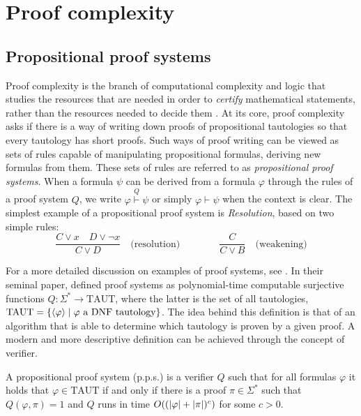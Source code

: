\chapter{Proof complexity} \label{chap:proof_complexity}

\section{Propositional proof systems}

Proof complexity is the branch of computational complexity and logic that studies the resources that are needed in order to \textit{certify} mathematical statements, rather than the resources needed to decide them \cite{kraj_book, arora_barak}. At its core, proof complexity asks if there is a way of writing down proofs of propositional tautologies so that every tautology has short proofs. Such ways of proof writing can be viewed as sets of rules capable of manipulating propositional formulas, deriving new formulas from them. These sets of rules are referred to as \textit{propositional proof systems}. When a formula $\psi$ can be derived from a formula $\varphi$ through the rules of a proof system $Q$, we write $\varphi \stackrel{Q}{\vdash} \psi$ or simply $\varphi \vdash \psi$ when the context is clear. The simplest example of a propositional proof system is \textit{Resolution}, based on two simple rules:
\[\dfrac{C \lor x \quad D \lor \lnot{x}}{C \lor D} \quad \text{(resolution)} \qquad\qquad \dfrac{C}{C \lor B} \quad \text{(weakening)}\]

For a more detailed discussion on examples of proof systems, see . In their seminal paper, \textcite{cook_proof_compx} defined proof systems as polynomial-time computable surjective functions $Q : \Sigma^* \to \mathrm{TAUT}$, where the latter is the set of all tautologies, $\mathrm{TAUT} = \{\left\langle\varphi\right\rangle \mid \varphi \text{ a DNF tautology}\}$. The idea behind this definition is that of an algorithm that is able to determine which tautology is proven by a given proof. A modern and more descriptive definition can be achieved through the concept of verifier.

\begin{definition}
    A propositional proof system (p.p.s.) is a verifier $Q$ such that for all formulas $\varphi$ it holds that $\varphi \in \mathrm{TAUT}$ if and only if there is a proof $\pi \in \Sigma^*$ such that $Q(\varphi, \pi) = 1$ and $Q$ runs in time $O((\left|\varphi\right| + \left|\pi\right|)^c)$ for some $c > 0$.
\end{definition}

